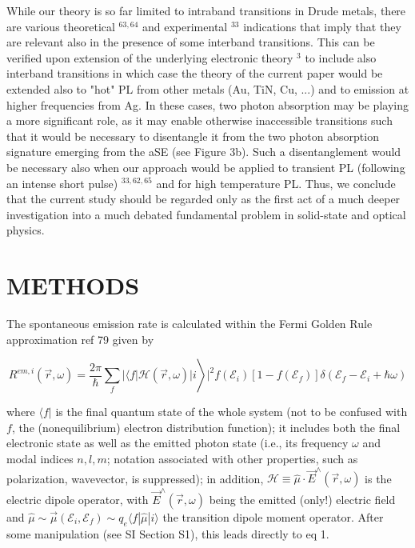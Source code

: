 \documentclass[10pt]{article}
\begin{document}
While our theory is so far limited to intraband transitions in Drude metals, there are various theoretical ${ }^{63,64}$ and experimental ${ }^{33}$ indications that imply that they are relevant also in the presence of some interband transitions. This can be verified upon extension of the underlying electronic theory ${ }^{3}$ to include also interband transitions in which case the theory of the current paper would be extended also to "hot" PL from other metals (Au, TiN, Cu, ...) and to emission at higher frequencies from Ag. In these cases, two photon absorption may be playing a more significant role, as it may enable otherwise inaccessible transitions such that it would be necessary to disentangle it from the two photon absorption signature emerging from the aSE (see Figure 3b). Such a disentanglement would be necessary also when our approach would be applied to transient PL (following an intense short pulse) ${ }^{33,62,65}$ and for high temperature PL. Thus, we conclude that the current study should be regarded only as the first act of a much deeper investigation into a much debated fundamental problem in solid-state and optical physics.

\section*{METHODS}
The spontaneous emission rate is calculated within the Fermi Golden Rule approximation ref 79 given by


\begin{equation*}
\left.R^{e m, i}(\vec{r}, \omega)=\frac{2 \pi}{\hbar} \sum_{f}|\langle f| \mathcal{H}(\vec{r}, \omega)| i\right\rangle\left.\right|^{2} f\left(\mathcal{E}_{i}\right)\left[1-f\left(\mathcal{E}_{f}\right)\right] \delta\left(\mathcal{E}_{f}-\mathcal{E}_{i}+\hbar \omega\right) \tag{10}
\end{equation*}


where $\langle f|$ is the final quantum state of the whole system (not to be confused with $f$, the (nonequilibrium) electron distribution function); it includes both the final electronic state as well as the emitted photon state (i.e., its frequency $\omega$ and modal indices $n, l, m$; notation associated with other properties, such as polarization, wavevector, is suppressed); in addition, $\mathcal{H} \equiv \hat{\mu} \cdot \vec{E}^{\wedge}(\vec{r}, \omega)$ is the electric dipole operator, with $\vec{E}^{\wedge}(\vec{r}, \omega)$ being the emitted (only!) electric field and $\hat{\mu} \sim \vec{\mu}\left(\mathcal{E}_{i}, \mathcal{E}_{f}\right) \sim q_{e}\langle f| \hat{\mu}|i\rangle$ the transition dipole moment operator. After some manipulation (see SI Section S1), this leads directly to eq 1.
\end{document}
